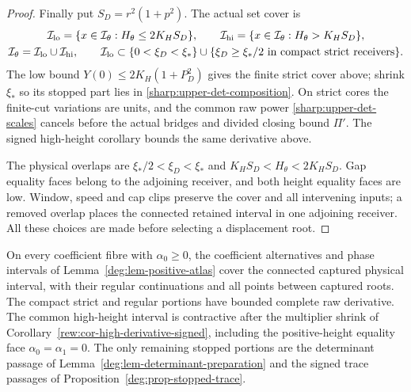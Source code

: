 \begin{proof}
Finally put \(S_D=r^2(1+p^2)\). The actual set cover is
\begin{equation}\label{deg:det-height-cover}
 \begin{gathered}
 \mathcal I_{\rm lo}=\{x\in\mathcal I_\theta:H_\theta\le2K_HS_D\},\qquad
 \mathcal I_{\rm hi}=\{x\in\mathcal I_\theta:H_\theta>K_HS_D\},\\
 \mathcal I_\theta=\mathcal I_{\rm lo}\cup\mathcal I_{\rm hi},\qquad
 \mathcal I_{\rm lo}\subset\{0<\xi_D<\xi_*\}\cup
 \{\xi_D\ge\xi_*/2\text{ in compact strict receivers}\}.
 \end{gathered}
\end{equation}
The low bound \(Y(0)\le2K_H(1+P_D^2)\) gives the finite
strict cover above; shrink \(\xi_*\) so its stopped part lies in
\eqref{sharp:upper-det-composition}. On strict cores the finite-cut
variations are units, and the common raw power
\eqref{sharp:upper-det-scales} cancels before the actual bridges and
divided closing bound \(\Pi'\). The signed high-height corollary
bounds the same derivative above.

The physical overlaps are \(\xi_*/2<\xi_D<\xi_*\) and
\(K_HS_D<H_\theta<2K_HS_D\). Gap equality faces belong to the
adjoining receiver, and both height equality faces are low. Window,
speed and cap clips preserve the cover and all intervening inputs;
a removed overlap places the connected retained interval in one
adjoining receiver. All these choices are made before selecting a
displacement root.
\end{proof}



\begin{lemma}
\label{deg:lem-nonnegative-domain}
On every coefficient fibre with \(\alpha_0\ge0\), the coefficient
alternatives and phase intervals of
Lemma~\ref{deg:lem-positive-atlas} cover the connected captured
physical interval, with their regular continuations and all points
between captured roots. The compact strict and regular portions have
bounded complete raw derivative. The common high-height interval is
contractive after the multiplier shrink of
Corollary~\ref{rew:cor-high-derivative-signed}, including the
positive-height equality face \(\alpha_0=\alpha_1=0\).
The only remaining stopped portions are the determinant passage of
Lemma~\ref{deg:lem-determinant-preparation} and the signed trace
passages of Proposition~\ref{deg:prop-stopped-trace}.
\end{lemma}


